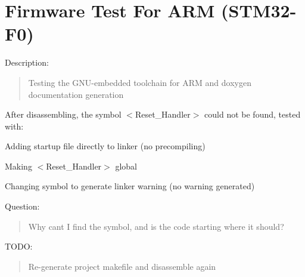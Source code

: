 \chapter{Firmware Test For ARM (STM32-\/\+F0)}
\hypertarget{index}{}\label{index}
\label{index_md__r_e_a_d_m_e}%
%
 Description\+:

\begin{quote}
Testing the GNU-\/embedded toolchain for ARM and doxygen documentation generation \end{quote}
After disassembling, the symbol {\ttfamily \texorpdfstring{$<$}{<}Reset\+\_\+\+Handler\texorpdfstring{$>$}{>}} could not be found, tested with\+:


\begin{DoxyItemize}
\item Adding startup file directly to linker (no precompiling)
\item Making {\ttfamily \texorpdfstring{$<$}{<}Reset\+\_\+\+Handler\texorpdfstring{$>$}{>}} global
\item Changing symbol to generate linker warning (no warning generated)
\end{DoxyItemize}

Question\+:

\begin{quote}
Why can\textquotesingle{}t I find the symbol, and is the code starting where it should? \end{quote}
TODO\+:

\begin{quote}
Re-\/generate project makefile and disassemble again \end{quote}
